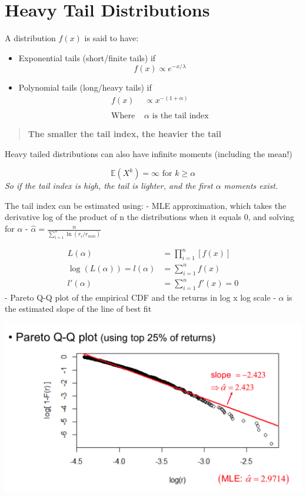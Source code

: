 \documentclass[
  oneside]{book}
\providecommand{\tightlist}{%
  \setlength{\itemsep}{0pt}\setlength{\parskip}{0pt}}
\begin{document}
\hypertarget{heavy-tail-distributions}{%
\section{Heavy Tail Distributions}\label{heavy-tail-distributions}}

A distribution \(f(x)\) is said to have:

\begin{itemize}
\tightlist
\item
  Exponential tails (short/finite tails) if
  \[f(x) \propto e^{-x/\lambda}\]
\item
  Polynomial tails (long/heavy tails) if
  \[
  \begin{aligned}
  f(x) &\propto x^{-(1+\alpha)}\\
  \\
  \text{Where } &\alpha \text{ is the tail index}
  \end{aligned}
  \]
\end{itemize}

\begin{quote}
\textbf{The smaller the tail index, the heavier the tail}
\end{quote}

Heavy tailed distributions can also have infinite moments (including the mean!)

\[
\mathbb{E}(X^{k}) = \infty \text{ for } k \geq \alpha
\]
\emph{So if the tail index is high, the tail is lighter, and the first \(\alpha\) moments exist.}

The tail index can be estimated using:
- MLE approximation, which takes the derivative log of the product of n the distributions when it equals 0, and solving for \(\alpha\)
- \(\hat{\alpha} = \frac{n}{\sum^n_{i=1}\ln\left( r_{i}/r_{min} \right)}\)

\[
\begin{aligned}
L(\alpha) &= \prod^{n}_{i=1}[f(x)]\\
\log(L(\alpha)) = l(\alpha) &= \sum^{n}_{i=1} f(x)\\
l'(\alpha) &= \sum^{n}_{i=1} f'(x) = 0
\end{aligned}
\]
- Pareto Q-Q plot of the empirical CDF and the returns in log x log scale
- \(\alpha\) is the estimated slope of the line of best fit

\includegraphics{Notes/Obsidian-Attachments/2-Return-Distributions-3.png}
\end{document}
